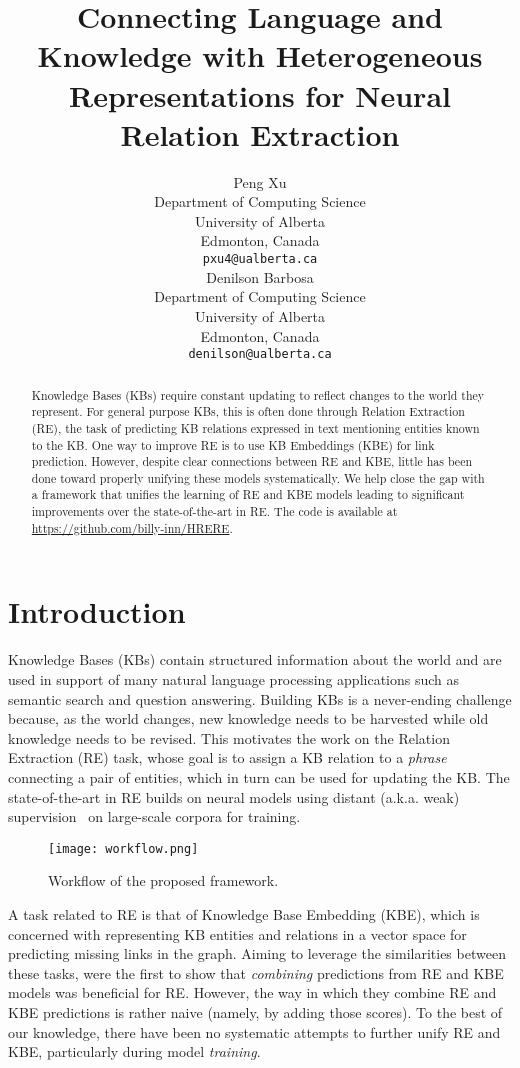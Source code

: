 \documentclass[11pt,a4paper]{article}
\title{Connecting Language and Knowledge with Heterogeneous Representations for Neural Relation Extraction}
\author{Peng Xu \\
  Department of Computing Science \\
  University of Alberta\\
  Edmonton, Canada\\
  {\tt pxu4@ualberta.ca} \\\And
  Denilson Barbosa \\
  Department of Computing Science \\
  University of Alberta\\
  Edmonton, Canada\\
  {\tt denilson@ualberta.ca} \\}
\date{}
\begin{document}
\maketitle
\begin{abstract}
Knowledge Bases (KBs) require constant updating to reflect changes to the world they represent.
For general purpose KBs, this is often done through Relation Extraction (RE), the task of predicting KB relations expressed in text mentioning entities known to the KB. 
One way to improve RE is to use KB Embeddings (KBE) for link prediction.
However, despite clear connections between RE and KBE, little has been done toward properly unifying these models systematically.
We help close the gap with a framework that unifies the learning of RE and KBE models leading to significant improvements over the state-of-the-art in RE.
The code is available at \url{https://github.com/billy-inn/HRERE}.
\end{abstract}

\section{Introduction}


Knowledge Bases (KBs) contain structured information about the world and are used in support of many natural language processing applications such as semantic search and question answering.
Building KBs is a never-ending challenge because, as the world changes, new knowledge needs to be harvested while old knowledge needs to be revised.
This motivates the work on the Relation Extraction (RE) task, whose goal is to assign a KB relation to a \emph{phrase} connecting a pair of entities, which in turn can be used for updating the KB.
The state-of-the-art in RE builds on neural models using distant (a.k.a. weak) supervision~\cite{mintz2009distant} on large-scale corpora for training.

\begin{figure*}[ht]
\begin{center}
 \texttt{[image: workflow.png]}
\end{center}
\caption{Workflow of the proposed framework.} \label{workflow}
\end{figure*}

A task related to RE is that of Knowledge Base Embedding (KBE), which is concerned with representing KB entities and relations in a vector space for predicting missing links in the graph.
Aiming to leverage the similarities between these tasks, \citet{weston2013connecting} were the first to show that \emph{combining} predictions from RE and KBE models was beneficial for RE.
However, the way in which they combine RE and KBE predictions is rather naive (namely, by adding those scores).
To the best of our knowledge, there have been no systematic attempts to further unify RE and KBE, particularly during model \emph{training}. 
\end{document}
